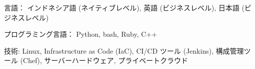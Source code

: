 

\begin{cvparagraph}

\begin{cvbullets}
    \item 言語： インドネシア語 (ネイティブレベル), 英語 (ビジネスレベル), 日本語 (ビジネスレベル)
    \item プログラミング言語：  Python, bash, Ruby, C++
    \item 技術: Linux, Infrastructure as Code (IaC), CI/CD ツール (Jenkins), 構成管理ツール (Chef), サーバーハードウェア, プライベートクラウド
\end{cvbullets}
\end{cvparagraph}
